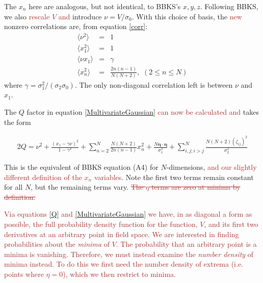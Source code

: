 \documentclass[12pt]{article}
\newcommand{\sh}[1]{\textcolor{brown}{#1}}
\begin{document}

The $x_n$ here are analogous, but not identical, to BBKS's $x, y, z$. Following BBKS, we also \sh{rescale $V$ and} introduce $\nu = V/\sigma_0$. With this choice of basis, the \sh{new} nonzero correlations are, from equation \eqref{corr}:
%
\begin{eqnarray}
  \langle\nu^2\rangle &=& 1 \nonumber\\
  \langle x_1^2\rangle&=&1 \\
  \langle\nu x_1\rangle &=& \gamma \nonumber\\
  \langle x_n^2 \rangle &=& \frac{2n(n-1)}{N(N+2)},\,\, (2\leq n \leq N) \nonumber
\end{eqnarray}
%
\noindent where $\gamma = \sigma_1^2/(\sigma_2 \sigma_0)$. The only non-diagonal correlation left is between $\nu$ and $x_1$.

The $Q$ factor in equation \eqref{MultivariateGaussian} \sh{can now be calculated and} takes the form

\begin{equation} \label{Q}
\begin{split}
2Q = \nu^2 + \frac{(x_1-\gamma \nu)^2}{1-\gamma^2}+\sum_{n=2}^N\frac{N(N+2)}{2n(n-1)}x_n^2 + \frac{N \pmb{\eta}\cdot \pmb{\eta}}{\sigma_1^2} + \sum_{i,j;i > j}^N\frac{N(N+2)(\zeta_{ij})^2}{\sigma_2^2}
\end{split}
\end{equation}
%

This is the equivalent of BBKS equation (A4) for $N$-dimensions, \sh{and our slightly different definition of the $x_n$ variables}. Note the first two terms remain constant for all $N$, but the remaining terms vary. \sh{\sout{The $\eta$ terms are zero at minima by definition.}}

\sh{Via equations \eqref{Q} and \eqref{MultivariateGaussian} we have, in as diagonal a form as possible, the full probability density function for the function, $V$, and its first two derivatives at an arbitrary point in field space. We are interested in finding probabilities about the \emph{minima} of $V$. The probability that an arbitrary point is a minima is vanishing. Therefore, we must instead examine the \emph{number density} of minima instead. To do this we first need the number density of extrema (i.e. points where $\eta=0$), which we then restrict to minima.}
\end{document}
